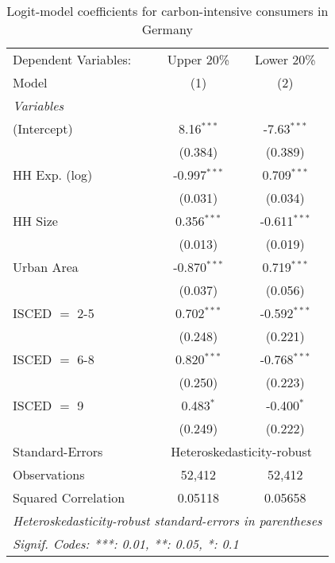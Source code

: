 
\begin{table}[htbp!]
   \centering
   \small
   \begin{adjustbox}{width = 1\textwidth, max height = 0.95\textheight, center}
      \begin{threeparttable}[b]
         \caption{\label{tab:Logit_1_DEU} Logit-model coefficients for carbon-intensive consumers in Germany}
         \begin{tabular}{lcc}
            \tabularnewline \midrule \midrule
            Dependent Variables: & Upper 20\%     & Lower 20\%\\   
            Model                & (1)            & (2)\\  
            \midrule
            \emph{Variables}\\
            (Intercept)          & 8.16$^{***}$   & -7.63$^{***}$\\   
                                 & (0.384)        & (0.389)\\   
            HH Exp. (log)        & -0.997$^{***}$ & 0.709$^{***}$\\   
                                 & (0.031)        & (0.034)\\   
            HH Size              & 0.356$^{***}$  & -0.611$^{***}$\\   
                                 & (0.013)        & (0.019)\\   
            Urban Area           & -0.870$^{***}$ & 0.719$^{***}$\\   
                                 & (0.037)        & (0.056)\\   
            ISCED $=$ 2-5        & 0.702$^{***}$  & -0.592$^{***}$\\   
                                 & (0.248)        & (0.221)\\   
            ISCED $=$ 6-8        & 0.820$^{***}$  & -0.768$^{***}$\\   
                                 & (0.250)        & (0.223)\\   
            ISCED $=$ 9          & 0.483$^{*}$    & -0.400$^{*}$\\   
                                 & (0.249)        & (0.222)\\   
            \midrule 
            Standard-Errors & \multicolumn{2}{c}{Heteroskedasticity-robust} \\ 
            Observations         & 52,412         & 52,412\\  
            Squared Correlation  & 0.05118        & 0.05658\\  
            \midrule \midrule
            \multicolumn{3}{l}{\emph{Heteroskedasticity-robust standard-errors in parentheses}}\\
            \multicolumn{3}{l}{\emph{Signif. Codes: ***: 0.01, **: 0.05, *: 0.1}}\\
         \end{tabular}
         

\end{threeparttable}
\end{adjustbox}
\end{table}

